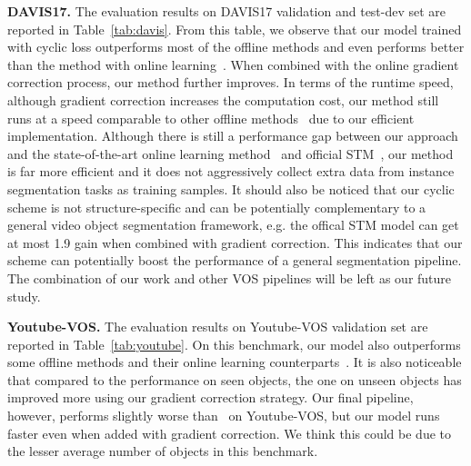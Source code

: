 \documentclass{article}
\begin{document}
\textbf{DAVIS17.} The evaluation results on DAVIS17 validation and test-dev set are reported in Table~\ref{tab:davis}. From this table, we observe that our model trained with cyclic loss outperforms most of the offline methods and even performs better than the method with online learning~\cite{voigtlaender17BMVC}. When combined with the online gradient correction process, our method further improves. In terms of the runtime speed, although gradient correction increases the computation cost, our method still runs at a speed comparable to other offline methods~\cite{Lin_2019_ICCV} due to our efficient implementation. Although there is still a performance gap between our approach and the state-of-the-art online learning method~\cite{luiten2018premvos} and official STM~\cite{Oh_2019_ICCV}, our method is far more efficient and it does not aggressively collect extra data from instance segmentation tasks as training samples. It should also be noticed that our cyclic scheme is not structure-specific and can be potentially complementary to a general video object segmentation framework, e.g. the offical STM model can get at most 1.9  gain when combined with gradient correction. This indicates that our scheme can potentially boost the performance of a general segmentation pipeline. The combination of our work and other VOS pipelines will be left as our future study.

\textbf{Youtube-VOS.} The evaluation results on Youtube-VOS validation set are reported in Table~\ref{tab:youtube}. On this benchmark, our model also outperforms some offline methods and their online learning counterparts~\cite{Xu_2018_S2S_ECCV,Zeng_2019_ICCV}. It is also noticeable that compared to the performance on seen objects, the one on unseen objects has improved more using our gradient correction strategy. Our final pipeline, however, performs slightly worse than~\cite{Lin_2019_ICCV} on Youtube-VOS, but our model runs faster even when added with gradient correction. We think this could be due to the lesser average number of objects in this benchmark.
\end{document}
